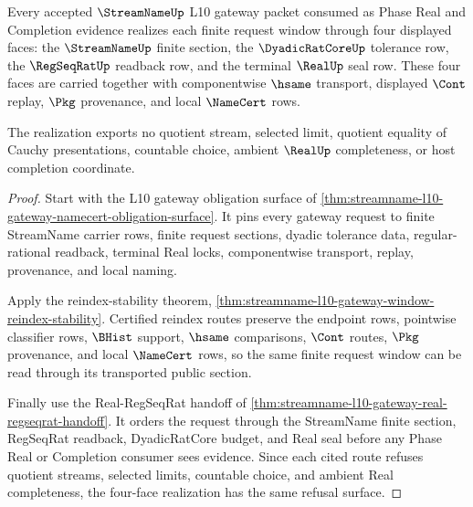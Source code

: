 \begin{theorem}
\label{thm:streamname-l10-face-window-realization}
Every accepted $\StreamNameUp$ L10 gateway packet consumed as Phase Real and Completion evidence realizes each finite request window through four displayed faces: the $\StreamNameUp$ finite section, the $\DyadicRatCoreUp$ tolerance row, the $\RegSeqRatUp$ readback row, and the terminal $\RealUp$ seal row. These four faces are carried together with componentwise $\hsame$ transport, displayed $\Cont$ replay, $\Pkg$ provenance, and local $\NameCert$ rows.

The realization exports no quotient stream, selected limit, quotient equality of Cauchy presentations, countable choice, ambient $\RealUp$ completeness, or host completion coordinate.
\end{theorem}
\begin{proof}
Start with the L10 gateway obligation surface of \autoref{thm:streamname-l10-gateway-namecert-obligation-surface}. It pins every gateway request to finite StreamName carrier rows, finite request sections, dyadic tolerance data, regular-rational readback, terminal Real locks, componentwise transport, replay, provenance, and local naming.

Apply the reindex-stability theorem, \autoref{thm:streamname-l10-gateway-window-reindex-stability}. Certified reindex routes preserve the endpoint rows, pointwise classifier rows, $\BHist$ support, $\hsame$ comparisons, $\Cont$ routes, $\Pkg$ provenance, and local $\NameCert$ rows, so the same finite request window can be read through its transported public section.

Finally use the Real-RegSeqRat handoff of \autoref{thm:streamname-l10-gateway-real-regseqrat-handoff}. It orders the request through the StreamName finite section, RegSeqRat readback, DyadicRatCore budget, and Real seal before any Phase Real or Completion consumer sees evidence. Since each cited route refuses quotient streams, selected limits, countable choice, and ambient Real completeness, the four-face realization has the same refusal surface.
\end{proof}
